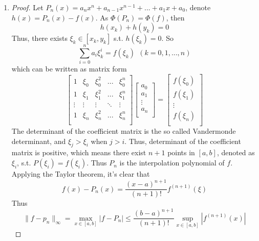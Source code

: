 \documentclass[paper=a4, fontsize=11pt]{scrartcl} %
\numberwithin{equation}{section} %
\numberwithin{figure}{section} %
\numberwithin{table}{section} %
\begin{document}
\begin{enumerate}
	\item 
		\begin{proof}
			Let $P_n(x) = a_n x^n + a_{n-1} x^{n-1} + ... + a_1 x + a_0$, denote $h(x) = P_n(x) - f(x)$. As $\Phi(P_n) = \Phi(f)$, then
			\begin{equation}
			h(x_k) + h(y_k) = 0
			\end{equation}
			Thus, there exists $\xi_k \in [x_k, y_k]$ s.t. $h(\xi_k) = 0$. So
			\begin{equation}
			\sum_{i=0}^{n}a_i \xi_k ^ i = f(\xi_k) \ \ (k=0, 1, ... , n)
			\end{equation}
			which can be written as matrix form
			\begin{equation}
			\begin{bmatrix}
				1 & \xi_0 & \xi_0^2 & ... & \xi_0^n \\
				1 & \xi_1 & \xi_1^2 & ... & \xi_1^n \\
				\vdots  & \vdots & \vdots & \ddots & \vdots \\
				1 & \xi_n & \xi_n^2 & ... & \xi_n^n \\
			\end{bmatrix}
			\begin{bmatrix}
				a_0\\
				a_1\\
				\vdots \\
				a_n\\
			\end{bmatrix}
			=
			\begin{bmatrix}
				f(\xi_0)\\
				f(\xi_1)\\
				\vdots \\
				f(\xi_n)\\
			\end{bmatrix}
			\end{equation}
			The determinant of the coefficient matrix is the so called Vandermonde determinant, and $\xi_j > \xi_i$ when $j>i$. Thus, determinant of the coefficient matrix is positive, which means there exist $n+1$ points in $[a, b]$, denoted as $\xi_i$, s.t. $P(\xi_i) = f(\xi_i)$. Thus $P_n$ is the interpolation polynomial of $f$.\\
			
			Applying the Taylor theorem, it's clear that 
			\begin{equation}
				f(x)-P_n(x) = \frac{(x-a)^{n+1}}{(n+1)!}f^{(n+1)}(\xi)
			\end{equation}
			Thus
			\begin{equation}
				\lVert f- p_n \rVert_\infty = \max_{x \in [a, b]} |f-P_n| \leq \frac{(b-a)^{n+1}}{(n+1)!}\sup_{x \in [a, b]}|f^{(n+1)}(x)|
			\end{equation}
			
		\end{proof}
	
\end{enumerate}
\end{document}
